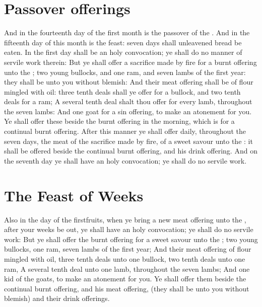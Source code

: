 \begin{biblechapter}
\section*{Passover offerings}
\verse And in the fourteenth day of the first month is the passover of the \LORD.
\verse And in the fifteenth day of this month is the feast: seven days shall unleavened bread be eaten.
\verse In the first day shall be an holy convocation; ye shall do no manner of servile work therein:
\verse But ye shall offer a sacrifice made by fire for a burnt offering unto the \LORD; two young bullocks, and one ram, and seven lambs of the first year: they shall be unto you without blemish:
\verse And their meat offering shall be of flour mingled with oil: three tenth deals shall ye offer for a bullock, and two tenth deals for a ram;
\verse A several tenth deal shalt thou offer for every lamb, throughout the seven lambs:
\verse And one goat for a sin offering, to make an atonement for you.
\verse Ye shall offer these beside the burnt offering in the morning, which is for a continual burnt offering.
\verse After this manner ye shall offer daily, throughout the seven days, the meat of the sacrifice made by fire, of a sweet savour unto the \LORD: it shall be offered beside the continual burnt offering, and his drink offering.
\verse And on the seventh day ye shall have an holy convocation; ye shall do no servile work.
\section*{The Feast of Weeks}
\verse Also in the day of the firstfruits, when ye bring a new meat offering unto the \LORD, after your weeks be out, ye shall have an holy convocation; ye shall do no servile work:
\verse But ye shall offer the burnt offering for a sweet savour unto the \LORD; two young bullocks, one ram, seven lambs of the first year;
\verse And their meat offering of flour mingled with oil, three tenth deals unto one bullock, two tenth deals unto one ram,
\verse A several tenth deal unto one lamb, throughout the seven lambs;
\verse And one kid of the goats, to make an atonement for you.
\verse Ye shall offer them beside the continual burnt offering, and his meat offering, (they shall be unto you without blemish) and their drink offerings.
\end{biblechapter}

